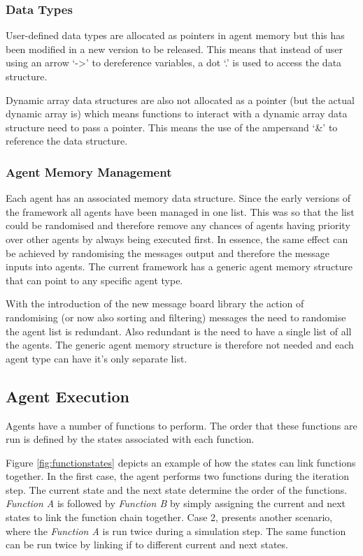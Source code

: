 \documentclass[a4paper,11pt]{article}
\begin{document}
\subsubsection{Data Types}

User-defined data types are allocated as pointers in agent memory
but this has been modified in a new version to be released. This
means that instead of user using an arrow `-\textgreater' to
dereference variables, a dot `.' is used to access the data
structure.

Dynamic array data structures are also not allocated as a pointer
(but the actual dynamic array is) which means functions to interact
with a dynamic array data structure need to pass a pointer. This
means the use of the ampersand `\&' to reference the data structure.

\subsubsection{Agent Memory Management}

Each agent has an associated memory data structure. Since the early
versions of the framework all agents have been managed in one list.
This was so that the list could be randomised and therefore remove
any chances of agents having priority over other agents by always
being executed first. In essence, the same effect can be achieved by
randomising the messages output and therefore the message inputs
into agents. The current framework has a generic agent memory
structure that can point to any specific agent type.

With the introduction of the new message board library the action of
randomising (or now also sorting and filtering) messages the need to
randomise the agent list is redundant. Also redundant is the need to
have a single list of all the agents. The generic agent memory
structure is therefore not needed and each agent type can have it's
only separate list.

\subsection{Agent Execution}

Agents have a number of functions to perform. The order that these
functions are run is defined by the states associated with each
function.

Figure \ref{fig:functionstates} depicts an example of how the states
can link functions together. In the first case, the agent performs
two functions during the iteration step. The current state and the
next state determine the order of the functions. \emph{Function A}
is followed by \emph{Function B} by simply assigning the current and
next states to link the function chain together. Case 2, presents
another scenario, where the \emph{Function A} is run twice during a
simulation step. The same function can be run twice by linking if to
different current and next states.
\end{document}
